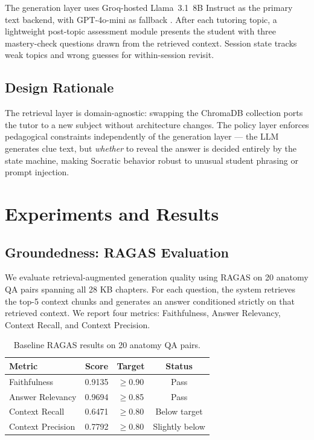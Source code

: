 \documentclass[11pt]{article}
\begin{document}
The generation layer uses Groq-hosted Llama~3.1~8B Instruct as the primary
text backend, with GPT-4o-mini as fallback \citep{groq_docs,gpt4omini_docs}.
After each tutoring topic, a lightweight post-topic assessment module presents
the student with three mastery-check questions drawn from the retrieved context.
Session state tracks weak topics and wrong guesses for within-session revisit.

\subsection{Design Rationale}

The retrieval layer is domain-agnostic: swapping the ChromaDB collection
ports the tutor to a new subject without architecture changes.
The policy layer enforces pedagogical constraints independently of the
generation layer --- the LLM generates clue text, but \emph{whether} to
reveal the answer is decided entirely by the state machine, making
Socratic behavior robust to unusual student phrasing or prompt injection.

\section{Experiments and Results}

\subsection{Groundedness: RAGAS Evaluation}
\label{sec:ragas}

We evaluate retrieval-augmented generation quality using RAGAS
\citep{es2024ragas} on 20 anatomy QA pairs spanning all 28 KB chapters.
For each question, the system retrieves the top-5 context chunks and generates
an answer conditioned strictly on that retrieved context.
We report four metrics: Faithfulness, Answer Relevancy, Context Recall, and
Context Precision.

\begin{table}[t]
\centering\small
\begin{tabularx}{\columnwidth}{@{}l c c c@{}}
\toprule
\textbf{Metric} & \textbf{Score} & \textbf{Target} & \textbf{Status} \\
\midrule
Faithfulness      & 0.9135 & $\geq$0.90 & Pass \\
Answer Relevancy  & 0.9694 & $\geq$0.85 & Pass \\
Context Recall    & 0.6471 & $\geq$0.80 & Below target \\
Context Precision & 0.7792 & $\geq$0.80 & Slightly below \\
\bottomrule
\end{tabularx}
\caption{Baseline RAGAS results on 20 anatomy QA pairs.}
\label{tab:ragas-results}
\end{table}
\end{document}
